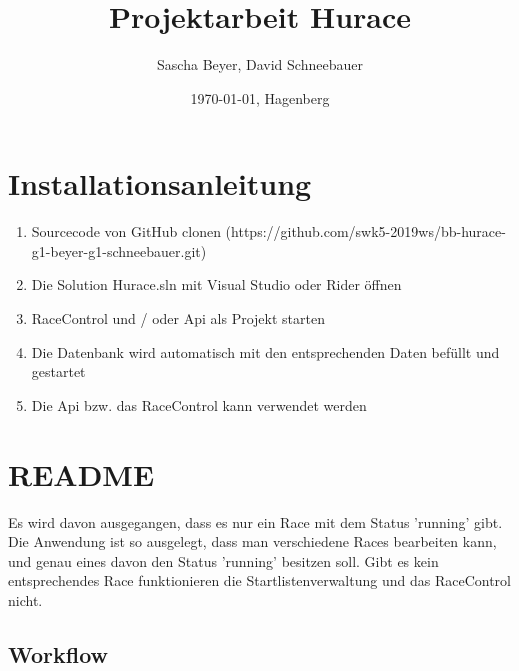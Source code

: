 \documentclass[a4paper, 12pt]{article}
\title{Projektarbeit Hurace}
\author{Sascha Beyer, David Schneebauer}
\date{\today{}, Hagenberg}
\begin{document}
	\maketitle
	\tableofcontents
	\newpage
	\section{Installationsanleitung}
	
	\begin{enumerate}
		\item{Sourcecode von GitHub clonen (https://github.com/swk5-2019ws/bb-hurace-g1-beyer-g1-schneebauer.git)}
		\item{Die Solution Hurace.sln mit Visual Studio oder Rider öffnen}
		\item{RaceControl und / oder Api als Projekt starten}
		\item{Die Datenbank wird automatisch mit den entsprechenden Daten befüllt und gestartet}
		\item{Die Api bzw. das RaceControl kann verwendet werden}
	\end{enumerate}
	
	\section{README}
	Es wird davon ausgegangen, dass es nur ein Race mit dem Status 'running' gibt. Die Anwendung ist so ausgelegt, dass man verschiedene Races bearbeiten kann, und genau eines davon den Status 'running' besitzen soll. Gibt es kein entsprechendes Race funktionieren die Startlistenverwaltung und das RaceControl nicht.
	
	\subsection{Workflow}
	
\end{document}
